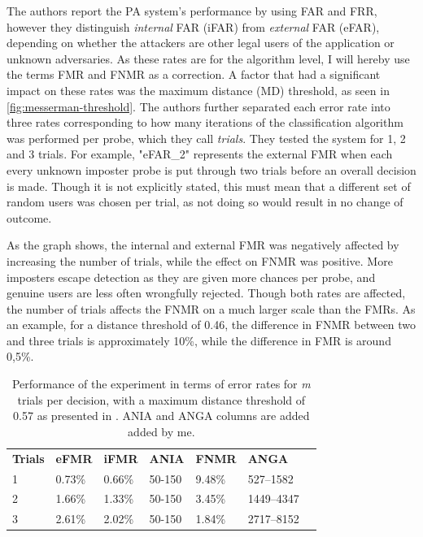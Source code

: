 \documentclass[informationsecurity]{gucmasterproject}
\begin{document}
The authors report the PA system's performance by using FAR and FRR, however they distinguish \textit{internal} FAR (iFAR) from \textit{external} FAR (eFAR), depending on whether the attackers are other legal users of the application or unknown adversaries.
As these rates are for the algorithm level, I will hereby use the terms FMR and FNMR as a correction.
A factor that had a significant impact on these rates was the maximum distance (MD) threshold, as seen in \autoref{fig:messerman-threshold}.
The authors further separated each error rate into three rates corresponding to how many iterations of the classification algorithm was performed per probe, which they call \textit{trials}. 
They tested the system for 1, 2 and 3 trials.
For example, "eFAR\_2" represents the external FMR when each every unknown imposter probe is put through two trials before an overall decision is made.
Though it is not explicitly stated, this must mean that a different set of random users was chosen per trial, as not doing so would result in no change of outcome.

As the graph shows, the internal and external FMR was negatively affected by increasing the number of trials, while the effect on FNMR was positive.
More imposters escape detection as they are given more chances per probe, and genuine users are less often wrongfully rejected.
Though both rates are affected, the number of trials affects the FNMR on a much larger scale than the FMRs.
As an example, for a distance threshold of 0.46, the difference in FNMR between two and three trials is approximately 10\%, while the difference in FMR is around 0,5\%.


\begin{table}[h]
    \centering
    \begin{tabular}{lllllll}
         \bf Trials & \bf eFMR & \bf iFMR & \bf ANIA & \bf FNMR & \bf ANGA\\
         1 & 0.73\% & 0.66\% & 50-150 & 9.48\% & 527--1582 \\
         2 & 1.66\% & 1.33\% & 50-150 & 3.45\% & 1449--4347\\
         3 & 2.61\% & 2.02\% & 50-150 & 1.84\% & 2717--8152\\
    \end{tabular}
    \caption{Performance of the experiment in terms of error rates for \textit{m} trials per decision, with a maximum distance threshold of 0.57 as presented in \cite{Messerman}. ANIA and ANGA columns are added added by me.}
    \label{tab:messerman-perf}
\end{table}
\end{document}
